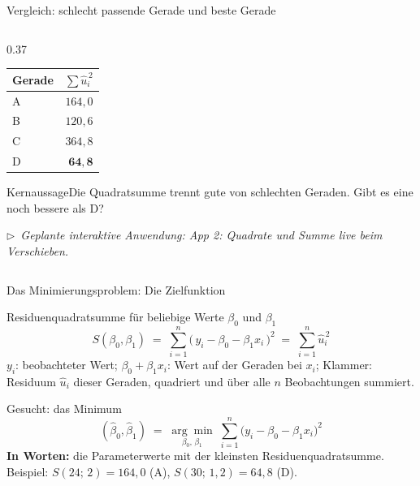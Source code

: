 \documentclass[aspectratio=169,11pt]{beamer}
\newcommand{\kernaussage}[1]{\begin{alertblock}{Kernaussage}#1\end{alertblock}}
\newcommand{\appmarker}[1]{\par{\scriptsize\color{hsbigray}$\triangleright$~\textit{Geplante interaktive Anwendung: #1}\par}}
\begin{document}
\begin{frame}{Vergleich: schlecht passende Gerade und beste Gerade}
\begin{columns}[T]
\begin{column}{0.37\textwidth}
\begin{center}
        \begin{tabular}{lr}
          \toprule
          Gerade & $\sum \hat{u}_i^{\,2}$ \\
          \midrule
          A & $164{,}0$ \\
          B & $120{,}6$ \\
          C & $364{,}8$ \\
          D & $\mathbf{64{,}8}$ \\
          \bottomrule
        \end{tabular}
      \end{center}
      \kernaussage{Die Quadratsumme trennt gute von schlechten Geraden.
        Gibt es eine noch bessere als D?}
      \appmarker{App 2: Quadrate und Summe live beim Verschieben.}
    \end{column}
  \end{columns}
\end{frame}

\begin{frame}{Das Minimierungsproblem: Die Zielfunktion}
  \begin{block}{Residuenquadratsumme für beliebige Werte $\beta_0$ und $\beta_1$}
    \vspace{-2pt}
    \[
      S(\beta_0,\beta_1) \;=\; \sum_{i=1}^{n}\bigl(\,y_i - \beta_0 - \beta_1 x_i\,\bigr)^{2}
      \;=\; \sum_{i=1}^{n} \hat{u}_i^{\,2}
    \]
    $y_i$: beobachteter Wert; $\beta_0 + \beta_1 x_i$: Wert auf der Geraden bei
    $x_i$; Klammer: Residuum $\hat{u}_i$ dieser Geraden, quadriert und über alle
    $n$ Beobachtungen summiert.
  \end{block}

  \begin{block}{Gesucht: das Minimum}
    \vspace{-2pt}
    \[
      (\hat{\beta}_0,\hat{\beta}_1)
      \;=\;
      \underset{\beta_0,\,\beta_1}{\arg\min}\;
      \sum_{i=1}^{n}\bigl(y_i - \beta_0 - \beta_1 x_i\bigr)^{2}
    \]
    \textbf{In Worten:} die Parameterwerte mit der kleinsten Residuenquadratsumme.
    Beispiel: $S(24;\,2) = 164{,}0$ (A), $S(30;\,1{,}2) = 64{,}8$ (D).
  \end{block}
\end{frame}
\end{document}
